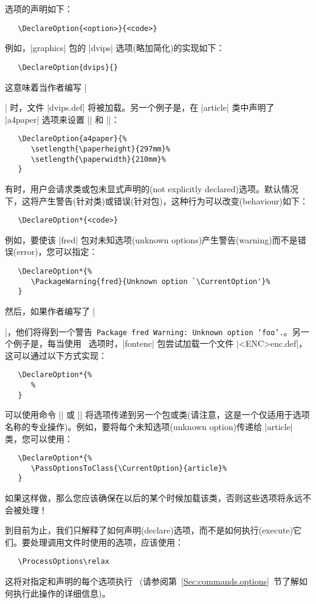\documentclass{ltxguide}[1995/11/28]
\begin{document}
选项的声明如下：
\begin{verbatim}
   \DeclareOption{<option>}{<code>}
\end{verbatim}
例如，|graphics| 包的 |dvips| 选项(略加简化)的实现如下：
\begin{verbatim}
   \DeclareOption{dvips}{}
\end{verbatim}
这意味着当作者编写 |\usepackage[dvips]{graphics}| 时，文件 |dvips.def| 将被加载。另一个例子是，在 |article| 类中声明了 |a4paper| 选项来设置 |\paperheight| 和 |\paperwidth|：
\begin{verbatim}
   \DeclareOption{a4paper}{%
      \setlength{\paperheight}{297mm}%
      \setlength{\paperwidth}{210mm}%
   }
\end{verbatim}
有时，用户会请求类或包未显式声明的(not explicitly declared)选项。默认情况下，这将产生警告(针对类)或错误(针对包)，这种行为可以改变(behaviour)如下：
\begin{verbatim}
   \DeclareOption*{<code>}
\end{verbatim}
例如，要使该 |fred| 包对未知选项(unknown options)产生警告(warning)而不是错误(error)，您可以指定：
\begin{verbatim}
   \DeclareOption*{%
      \PackageWarning{fred}{Unknown option `\CurrentOption'}%
   }
\end{verbatim}
然后，如果作者编写了 |\usepackage[foo]{fred}|，他们将得到一个警告\ \texttt{Package fred Warning: Unknown option `foo'.}。另一个例子是，每当使用 \ 选项时，|fontenc| 包尝试加载一个文件 |<ENC>enc.def|，这可以通过以下方式实现：
\begin{verbatim}
   \DeclareOption*{%
      %
   }
\end{verbatim}
可以使用命令 |\PassOptionsToPackage| 或 |\PassOptionsToClass| 将选项传递到另一个包或类(请注意，这是一个仅适用于选项名称的专业操作)。例如，要将每个未知选项(unknown option)传递给 |article| 类，您可以使用：
\begin{verbatim}
   \DeclareOption*{%
      \PassOptionsToClass{\CurrentOption}{article}%
   }
\end{verbatim}
如果这样做，那么您应该确保在以后的某个时候加载该类，否则这些选项将永远不会被处理！

到目前为止，我们只解释了如何声明(declare)选项，而不是如何执行(execute)它们。要处理调用文件时使用的选项，应该使用：
\begin{verbatim}
   \ProcessOptions\relax
\end{verbatim}
这将对指定和声明的每个选项执行 \ (请参阅第~\ref{Sec:commands.options}~节了解如何执行此操作的详细信息)。
\end{document}
